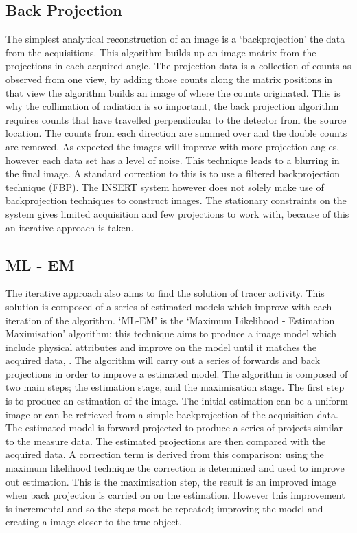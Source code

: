 \subsection{Back Projection}
The simplest analytical reconstruction of an image is a `backprojection' the data from the acquisitions. This algorithm builds up an image matrix from the projections in each acquired angle. The projection data is a collection of counts as observed from one view, by adding those counts along the matrix positions in that view the algorithm builds an image of where the counts originated. This is why the collimation of radiation is so important, the back projection algorithm requires counts that have travelled perpendicular to the detector from the source location. The counts from each direction are summed over and the double counts are removed. As expected the images will improve with more projection angles, however each data set has a level of noise. This technique leads to a blurring in the final image. A standard correction to this is to use a filtered backprojection technique (FBP). The INSERT system however does not solely make use of backprojection techniques to construct images. The stationary constraints on the system gives limited acquisition and few projections to work with, because of this an iterative approach is taken. 
\subsection{ML - EM}
The iterative approach also aims to find the solution of tracer activity. This solution is composed of a series of estimated models which improve with each iteration of the algorithm. `ML-EM' is the `Maximum Likelihood - Estimation Maximisation' algorithm; this technique aims to produce a image model which include physical attributes and improve on the model until it matches the acquired data, \cite{4307558}. The algorithm will carry out a series of forwards and back projections in order to improve a estimated model. The algorithm is composed of two main steps; the estimation stage, and the maximisation stage. The first step is to produce an estimation of the image. The initial estimation can be a uniform image or can be retrieved from a simple backprojection of the acquisition data. The estimated model is forward projected to produce a series of projects similar to the measure data. The estimated projections are then compared with the acquired data. A correction term is derived from this comparison; using the maximum likelihood technique the correction is determined and used to improve out estimation. This is the maximisation step, the result is an improved image when back projection is carried on on the estimation. However this improvement is incremental and so the steps most be repeated; improving the model and creating a image closer to the true object. 


